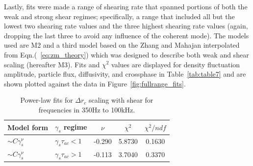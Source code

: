 \documentclass[aip,pop,amsmath,amssymb,peprint,superscriptaddress]{revtex4-1} %
\begin{document}
Lastly, fits were made a range of shearing rate that spanned
portions of both the weak and strong shear regimes; specifically, a
range that included all but the lowest two shearing rate values and
the three highest shearing rate values (again, dropping the last three to avoid any influence of the coherent mode). The models used are M2 and a third model based on the Zhang and Mahajan interpolated from Eqn.(~\ref{eq:zm_theory}) which was designed to describe both weak and shear scaling (hereafter M3). Fits and $\chi^{2}$ values are displayed for density fluctuation amplitude, particle flux, diffusivity, and crossphase in Table~\ref{tab:table7} and are shown plotted against the data in Figure~\ref{fig:fullrange_fits}.

\begin{table}
\caption{\label{tab:table6}Power-law fits for $\Delta r_{c}$ scaling with shear for frequencies in 350Hz to 100kHz.}
\begin{ruledtabular}
\begin{tabular}{llccc}
Model form&$\gamma_{s}$ regime&$\nu$&$\chi^2$&$\chi^2/ndf$\\
\hline
$\sim C\gamma_{s}^\nu$&$\gamma_{s}\tau_{ac}<1$ &-0.290 &5.8730 &0.1630\\
$\sim C\gamma_{s}^\nu$&$\gamma_{s}\tau_{ac}>1$ &-0.113 &3.7040 &0.3370\\
\end{tabular}
\end{ruledtabular}
\end{table}
\end{document}

